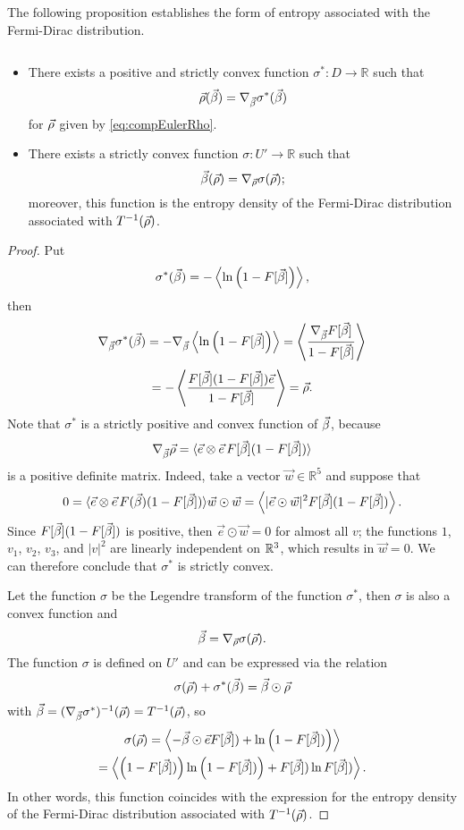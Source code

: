 The following proposition establishes the form of entropy associated with the Fermi-Dirac distribution.
\begin{theorem}\label{th:entropy}
\[\quad\]
\begin{itemize}
	\item There exists a positive and strictly convex function $\sigma^\ast:D\to \mathbb R$ such that
	\[{\vec\rho}({\vec\beta})=\nabla_{{\vec\beta}}\sigma^\ast({\vec\beta})\]
	for ${\vec\rho}$ given by \eqref{eq:compEulerRho}.
	\item There exists a strictly convex function $\sigma:U'\to \mathbb R$ such that 
	\[{\vec\beta}({\vec\rho}) = \nabla_{{\vec\rho}}\sigma({\vec\rho});\] moreover, this function is the entropy density of the Fermi-Dirac distribution associated with $T^{-1}({\vec\rho})$.
\end{itemize}
\end{theorem}
\begin{proof}
Put
\[\sigma^\ast({\vec\beta})=-\left\langle \ln\left(1-F[{\vec\beta}]\right)\right\rangle,\]
then
\[\nabla_{{\vec\beta}}\sigma^\ast({\vec\beta}) = -\nabla_{{\vec\beta}} \left\langle \ln\left(1-F[{\vec\beta}]\right)\right\rangle=
\left\langle \frac{\nabla_{{\vec\beta}} F[{\vec\beta}]}{1-F[{\vec\beta}]}  \right\rangle
 \]
 \[
 =-\left\langle \frac{ F[{\vec\beta}](1-F[{\vec\beta}])\vec e}{1-F[{\vec\beta}]}  \right\rangle={\vec\rho}.
 \]
Note that $\sigma^\ast$ is a strictly positive and convex function of
${\vec\beta}$, because 
\[\nabla_{{\vec\beta}}\vec \rho=\langle\vec e \otimes \vec e \,F[{\vec\beta}](1-F[{\vec\beta}] )\rangle\]
is a positive definite matrix. Indeed, take a vector $\vec w\in\mathbb R^5$ and suppose that
\[
0= \langle\vec e \otimes \vec e \,F(\vec
\beta)(1-F[{\vec\beta}] )\rangle \vec w\odot\vec w  = \left\langle|\vec e \odot \vec w|^2 F[{\vec\beta}](1-F[{\vec\beta}] )\right\rangle.
\]
Since $F[{\vec\beta}](1-F[{\vec\beta}])$ is positive, then $\vec e \odot \vec w =0$ for almost all $v$; the functions $1$, $v_1$, $v_2$, $v_3$, and $|v|^2$ are linearly independent on ${\mathbb {R}^3}$, which results in $\vec w=0$. We can therefore conclude that $\sigma^\ast$ is strictly convex.


Let the function $\sigma$ be the Legendre transform of the function $\sigma^\ast$, then $\sigma $ is also a  convex function and 
\[{\vec\beta} = \nabla_{{\vec\rho}}\sigma({\vec\rho}).\]The function $\sigma$  is defined on $U'$ and can be expressed
 via the relation
\[\sigma({\vec\rho})+\sigma^\ast({\vec\beta})={\vec\beta}\odot\vec \rho\] with
${\vec\beta}    = (\nabla_{\vec\beta}\sigma^\ast)^{-1}({\vec\rho}) = T^{-1}({\vec\rho})$, so
\begin{multline}\label{eq:sigma}
	\sigma(\vec \rho)=\left\langle-{\vec\beta}\odot\vec e
F[{\vec\beta}])+\ln\left(1-F[{\vec\beta}])\right) \right\rangle\\
=\left\langle \left(1-F[{\vec\beta}])\right)\ln\left(1-F[{\vec\beta}])\right)
+F[{\vec\beta}])\ln F[{\vec\beta}])\right\rangle.
\end{multline}
In other words, this function coincides with the expression for the entropy density of
the Fermi-Dirac distribution associated with $T^{-1} ({\vec\rho})$.
\end{proof}


